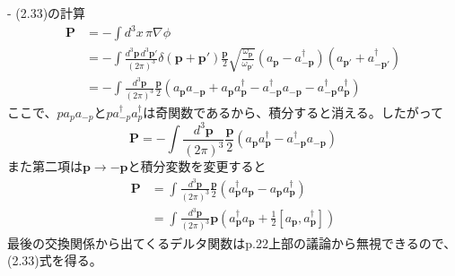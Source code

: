 \documentclass[a4paper]{ltjsarticle}
\begin{document}
- (2.33)の計算
\begin{align*}
  \bm{P} & = - \int d^3x \, \pi \nabla \phi \\
             & = -\int \frac{d^3\bm{p} \, d^3\bm{p}'}{(2\pi)^3} \delta(\bm{p}+\bm{p}') \frac{\bm{p}}{2} \sqrt{\frac{\omega_{\bm{p}}}{\omega_{\bm{p}'}}} (a_{\bm{p}} - a_{-\bm{p}}^\dagger)(a_{\bm{p}'} + a_{-\bm{p}'}^\dagger) \\
             & = - \int \frac{d^3\bm{p}}{(2\pi)^3} \frac{\bm{p}}{2} (a_{\bm{p}} a_{-\bm{p}} + a_{\bm{p}} a_{\bm{p}}^\dagger - a_{-\bm{p}}^\dagger a_{-\bm{p}} - a_{-\bm{p}}^\dagger a_{\bm{p}}^\dagger)
\end{align*}
ここで、$p a_p a_{-p}$と$p a_{-p}^\dagger a_p^\dagger$は奇関数であるから、積分すると消える。したがって
\[
  \bm{P} = - \int \frac{d^3\bm{p}}{(2\pi)^3} \frac{\bm{p}}{2} (a_{\bm{p}} a_{\bm{p}}^\dagger - a_{-\bm{p}}^\dagger a_{-\bm{p}})
\]
また第二項は$\bm{p} \to -\bm{p}$と積分変数を変更すると
\begin{align*}
  \bm{P} & = \int \frac{d^3\bm{p}}{(2\pi)^3} \frac{\bm{p}}{2} (a_{\bm{p}}^\dagger a_{\bm{p}} - a_{\bm{p}} a_{\bm{p}}^\dagger) \\
             & = \int \frac{d^3\bm{p}}{(2\pi)^3} \bm{p} (a_{\bm{p}}^\dagger a_{\bm{p}} + \frac{1}{2}[a_{\bm{p}}, a_{\bm{p}}^\dagger])
\end{align*}
最後の交換関係から出てくるデルタ関数はp.22上部の議論から無視できるので、(2.33)式を得る。
\end{document}
